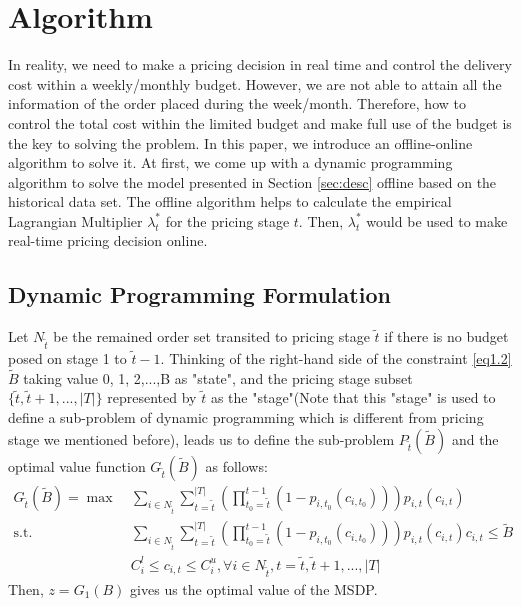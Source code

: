 \documentclass[sigconf,authordraft]{acmart}
\begin{document}
\section{Algorithm}\label{sec:alg}
In reality, we need to make a pricing decision in real time and control the delivery cost within a weekly/monthly budget. However, we are not able to attain all the information of the order placed during the week/month. Therefore, how to control the total cost within the limited budget and make full use of the budget is the key to solving the problem. In this paper, we introduce an offline-online algorithm to solve it. At first, we come up with a dynamic programming algorithm to solve the model presented in Section \ref{sec:desc} offline based on the historical data set. The offline algorithm helps to calculate the empirical Lagrangian Multiplier $\lambda^*_t$ for the pricing stage $t$. Then, $\lambda^*_t$ would be used to make real-time pricing decision online.
\subsection{Dynamic Programming Formulation}
Let $N_{\tilde{t}}$ be the remained order set transited to pricing stage $\tilde{t}$ if there is no budget posed on stage 1 to $\tilde{t}-1$. Thinking of the right-hand side of the constraint \eqref{eq1.2} $\tilde{B}$ taking value 0, 1, 2,...,B as "state", and the pricing stage subset $\{\tilde{t},\tilde{t}+1,...,|T|\}$ represented by $\tilde{t}$ as the "stage"(Note that this "stage" is used to define a sub-problem of dynamic programming which is different from pricing stage we mentioned before), leads us to define the sub-problem $P_{\tilde{t}}(\tilde{B})$ and the optimal value function $G_{\tilde{t}}(\tilde{B})$ as follows:
\begin{align}
    \label{eq2.1}G_{\tilde{t}}(\tilde{B})= \max~& \sum_{i\in N_{\tilde{t}}}\sum_{t=\tilde{t}}^{|T|}(\prod_{t_0=\tilde{t}}^{t-1} (1-p_{i,t_0}(c_{i,t_0})))p_{i,t}(c_{i,t}) \\
    \label{eq2.2}\mbox{s.t. }& \sum_{i\in N_{\tilde{t}}}\sum_{t=\tilde{t}}^{|T|}(\prod_{t_0=\tilde{t}}^{t-1} (1-p_{i,t_0}(c_{i,t_0})))p_{i,t}(c_{i,t})c_{i,t}\le \tilde{B}\\
    \label{eq2.3}& C_i^l\le c_{i,t}\le C_i^u  ,\forall i \in N_{\tilde{t}}, t=\tilde{t},\tilde{t}+1,...,|T|
\end{align}
  Then, $z=G_{1}(B)$ gives us the optimal value of the MSDP\cite{wolsey1998integer}. 
  
\end{document}
